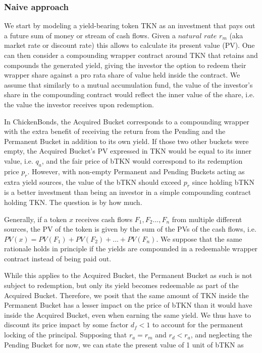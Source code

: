\documentclass{article}
\begin{document}
\subsubsection{Naive approach}
We start by modeling a yield-bearing token TKN as an investment that pays out a future sum of money or stream of cash flows. Given a $\textit{natural rate}$ $r_m$ (aka market rate or discount rate) this allows to calculate its present value (PV). One can then consider a compounding wrapper contract around TKN that retains and compounds the generated yield, giving the investor the option to redeem their wrapper share against a pro rata share of value held inside the contract. We assume that similarly to a mutual accumulation fund, the value of the investor's share in the compounding contract would reflect the inner value of the share, i.e. the value the investor receives upon redemption. 

In ChickenBonds, the Acquired Bucket corresponds to a compounding wrapper with the extra benefit of receiving the return from the Pending and the Permanent Bucket in addition to its own yield. If those two other buckets were empty, the Acquired Bucket's PV expressed in TKN would be equal to its inner value, i.e. $q_a$, and the fair price of bTKN would correspond to its redemption price $p_r$. However, with non-empty Permanent and Pending Buckets acting as extra yield sources, the value of the bTKN should exceed $p_r$ since holding bTKN is a better investment than being an investor in a simple compounding contract holding TKN. The question is by how much.

Generally, if a token $x$ receives cash flows $F_1, F_2..., F_n$ from multiple different sources, the PV of the token is given by the sum of the PVs of the cash flows, i.e. $PV(x) = PV(F_1) + PV(F_2) + ... + PV(F_n)$. We suppose that the same rationale holds in principle if the yields are compounded in a redeemable wrapper contract instead of being paid out. 

While this applies to the Acquired Bucket, the Permanent Bucket as such is not subject to redemption, but only its yield becomes redeemable as part of the Acquired Bucket. Therefore, we posit that the same amount of TKN inside the Permanent Bucket has a lesser impact on the price of bTKN than it would have inside the Acquired Bucket, even when earning the same yield. We thus have to discount its price impact by some factor $d_f < 1$ to account for the permanent locking of the principal. Supposing that $r_a = r_m$ and $r_d < r_a$, and neglecting the Pending Bucket for now, we can state the present value of 1 unit of bTKN as
\end{document}
